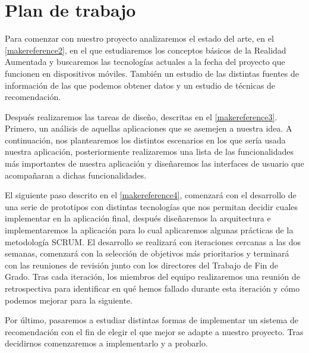 \section{Plan de trabajo}

Para comenzar con nuestro proyecto analizaremos el estado del arte, en el
 \autoref{makereference2}, en el que estudiaremos los conceptos básicos de la
 Realidad Aumentada y buscaremos las tecnologías actuales a la fecha del proyecto
 que funcionen en dispositivos móviles. También un estudio de las distintas
 fuentes de información de las que podemos obtener datos y un estudio de
 técnicas de recomendación.


  
Después realizaremos las tareas de diseño, descritas en el
 \autoref{makereference3}. Primero, un análisis de aquellas aplicaciones que se
 asemejen a nuestra idea. A continuación, nos plantearemos los distintos
 escenarios en los que sería usada nuestra aplicación, posteriormente
 realizaremos una lista de las funcionalidades más importantes de nuestra
 aplicación y diseñaremos las interfaces de usuario que acompañaran a dichas
 funcionalidades. 


   
El siguiente paso descrito en el \autoref{makereference4}, comenzará con
 el desarrollo de una serie de prototipos con distintas tecnologías que nos permitan
 decidir cuales implementar en la aplicación final, después diseñaremos la
 arquitectura e implementaremos la aplicación para lo cual aplicaremos algunas
 prácticas de la metodología SCRUM. El desarrollo se realizará con iteraciones
 cercanas a las dos semanas, comenzará con la selección de objetivos más
 prioritarios y terminará con las reuniones de revisión junto con los directores
 del Trabajo de Fin de Grado. Tras cada iteración, los miembros del equipo
 realizaremos una reunión de retrospectiva para identificar en qué hemos fallado
 durante esta iteración y cómo podemos mejorar para la siguiente.



Por último, pasaremos a estudiar distintas formas de implementar un sistema
 de recomendación con el fin de elegir el que mejor se adapte a nuestro
 proyecto. Tras decidirnos comenzaremos a implementarlo y a probarlo.


\label{makereference1.3}



